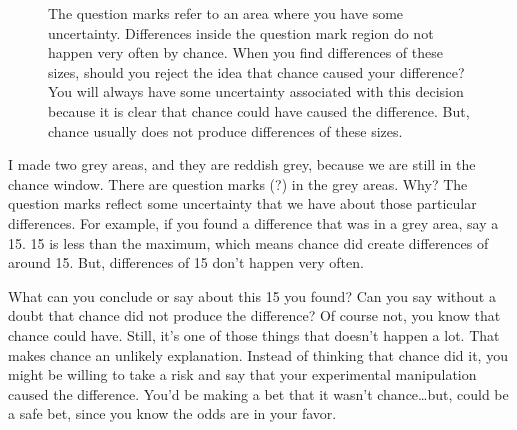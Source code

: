\documentclass[
  letterpaper,
  DIV=11,
  numbers=noendperiod]{scrreprt}
\begin{document}
\begin{figure}


\caption{\label{fig-5crumpuncertainty}The question marks refer to an
area where you have some uncertainty. Differences inside the question
mark region do not happen very often by chance. When you find
differences of these sizes, should you reject the idea that chance
caused your difference? You will always have some uncertainty associated
with this decision because it is clear that chance could have caused the
difference. But, chance usually does not produce differences of these
sizes.}

\end{figure}%

I made two grey areas, and they are reddish grey, because we are still
in the chance window. There are question marks (?) in the grey areas.
Why? The question marks reflect some uncertainty that we have about
those particular differences. For example, if you found a difference
that was in a grey area, say a 15. 15 is less than the maximum, which
means chance did create differences of around 15. But, differences of 15
don't happen very often.

What can you conclude or say about this 15 you found? Can you say
without a doubt that chance did not produce the difference? Of course
not, you know that chance could have. Still, it's one of those things
that doesn't happen a lot. That makes chance an unlikely explanation.
Instead of thinking that chance did it, you might be willing to take a
risk and say that your experimental manipulation caused the difference.
You'd be making a bet that it wasn't chance\ldots but, could be a safe
bet, since you know the odds are in your favor.
\end{document}
